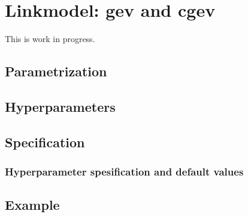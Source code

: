 \documentclass[a4paper,11pt]{article}
\begin{document}
\section*{Linkmodel: gev and cgev}

This is work in progress.

\subsection*{Parametrization}


\subsection*{Hyperparameters}


\subsection*{Specification}

\subsubsection*{Hyperparameter spesification and default values}



\subsection*{Example}
\end{document}
